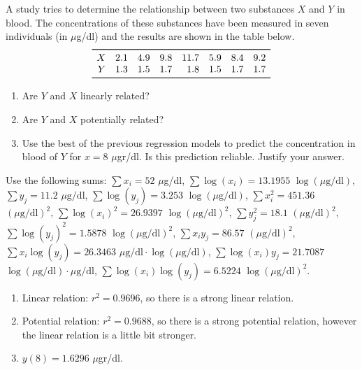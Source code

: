 {A study tries to determine the relationship between two substances $X$ and $Y$ in blood.
The concentrations of these substances have been measured in seven individuals (in $\mu$g/dl) and the results are shown in the table below.
\[
\begin{array}{rrrrrrrr}
\toprule
X & 2.1 & 4.9 & 9.8 & 11.7 & 5.9 & 8.4 & 9.2 \\
Y & 1.3 & 1.5 & 1.7 & 1.8 & 1.5 & 1.7 & 1.7 \\
\bottomrule
\end{array}
\]

\begin{enumerate}
\item Are $Y$ and $X$ linearly related?
\item Are $Y$ and $X$ potentially related?
\item Use the best of the previous regression models to predict the concentration in blood of $Y$ for $x=8$ $\mu$gr/dl.
Is this prediction reliable.
Justify your answer.
\end{enumerate}

Use the following sums:
$\sum x_i=52$ $\mu$g/dl, $\sum \log(x_i)=13.1955$ $\log(\mu\mbox{g/dl})$, $\sum y_j=11.2$ $\mu\mbox{g/dl}$, $\sum \log(y_j)=3.253$ $\log(\mu\mbox{g/dl})$, $\sum x_i^2=451.36$ $(\mu\mbox{g/dl})^2$, $\sum \log(x_i)^2=26.9397$ $\log(\mu\mbox{g/dl})^2$, $\sum y_j^2=18.1$ $(\mu\mbox{g/dl})^2$, $\sum \log(y_j)^2=1.5878$ $\log(\mu\mbox{g/dl})^2$, $\sum x_iy_j=86.57$ $(\mu\mbox{g/dl})^2$, $\sum x_i\log(y_j)=26.3463$ $\mu\mbox{g/dl}\cdot\log(\mu\mbox{g/dl})$, $\sum \log(x_i)y_j=21.7087$ $\log(\mu\mbox{g/dl})\cdot\mu\mbox{g/dl}$, $\sum \log(x_i)\log(y_j)=6.5224$ $\log(\mu\mbox{g/dl})^2$.
}
{\begin{enumerate}
\item Linear relation: $r^2=0.9696$, so there is a strong linear relation.
\item Potential relation: $r^2=0.9688$, so there is a strong potential relation, however the linear relation is a little bit stronger.
\item $y(8)=1.6296$ $\mu$gr/dl.
\end{enumerate}
}
